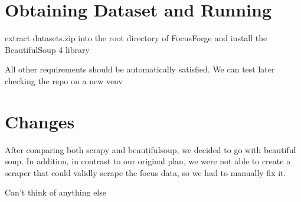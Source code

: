 \documentclass[fontsize=11pt]{article}
\begin{document}

    

\section*{Obtaining Dataset and Running}
extract datasets.zip into the root directory of FocusForge and install the  BeautifulSoup 4 library\\
\begin{huge}
All other requirements should be automatically satisfied. We can test later checking the repo on a new venv
\end{huge}
\section*{Changes}
After comparing both scrapy and beautifulsoup, we decided to go with beautiful soup. In addition, in contrast to our original plan, we were not able to create a scraper that could validly scrape the focus data, so we had to manually fix it.
\begin{huge} Can't think of anything else \end{huge}
\end{document}
